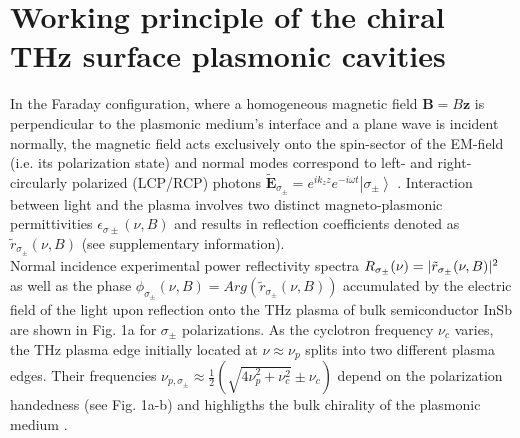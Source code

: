 \documentclass[twocolumn]{article}
\begin{document}
\section*{Working principle of the chiral THz surface plasmonic cavities}
In the Faraday configuration, where a homogeneous magnetic field $\boldsymbol{B}=B\boldsymbol{z}$ is perpendicular to the plasmonic medium's interface and a plane wave is incident normally, the magnetic field acts exclusively onto the spin-sector of the EM-field (i.e. its polarization state) and normal modes correspond to left- and right-circularly polarized (LCP/RCP) photons
${\widetilde{\boldsymbol{E}}}_{{\sigma }_{\pm }}\boldsymbol{=}e^{ik_zz}e^{-i\omega t}\left.\left|{\sigma }_{\pm }\right.\right\rangle $  \cite{Palik_1970}. Interaction between light and the plasma involves two distinct magneto-plasmonic permittivities $\epsilon_{{\sigma }\pm}(\nu,B)$ and results in reflection coefficients denoted as $\tilde{r}_{{\sigma }_\pm}(\nu,B)$ (see supplementary information).\\
\noindent Normal incidence experimental power reflectivity spectra $R_{{\sigma }_\pm}(\nu)=\arrowvert \tilde{r}_{{\sigma }_\pm}(\nu,B)\arrowvert^2$ as well as the phase $\phi_{{\sigma }_\pm}(\nu,B)=Arg(\tilde{r}_{{\sigma }_\pm}(\nu,B))$ accumulated by the electric field of the light upon reflection onto the THz plasma of bulk semiconductor InSb are shown in Fig. 1a for $\sigma_\pm$ polarizations. As the cyclotron frequency ${\nu }_c$ varies, the THz plasma edge initially located at $\nu \approx {\nu }_p$ splits into two different plasma edges. Their frequencies ${\nu }_{p,{\sigma }_{\pm }}\approx \frac{1}{2}\left(\sqrt{{4\nu }^2_p+{\nu }^2_c}\pm {\nu }_c\right)$ depend on the polarization handedness (see Fig. 1a-b) and highligths the bulk chirality of the plasmonic medium \cite{Palik_1970,Wang_2009}.\\ 
\end{document}
